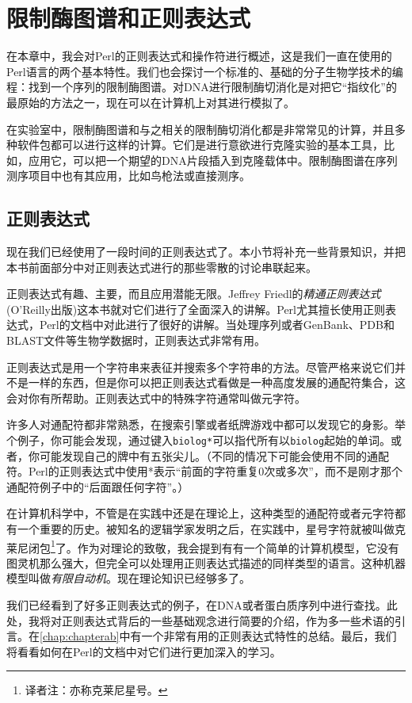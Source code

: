 \chapter{限制酶图谱和正则表达式}
\label{chap:chapter9}
\minitoc

在本章中，我会对Perl的正则表达式和操作符进行概述，这是我们一直在使用的Perl语言的两个基本特性。我们也会探讨一个标准的、基础的分子生物学技术的编程：找到一个序列的限制酶图谱。对DNA进行限制酶切消化是对把它“指纹化”的最原始的方法之一，现在可以在计算机上对其进行模拟了。

在实验室中，限制酶图谱和与之相关的限制酶切消化都是非常常见的计算，并且多种软件包都可以进行这样的计算。它们是进行意欲进行克隆实验的基本工具，比如，应用它，可以把一个期望的DNA片段插入到克隆载体中。限制酶图谱在序列测序项目中也有其应用，比如鸟枪法或直接测序。

\section{正则表达式}
现在我们已经使用了一段时间的正则表达式了。本小节将补充一些背景知识，并把本书前面部分中对正则表达式进行的那些零散的讨论串联起来。

正则表达式有趣、主要，而且应用潜能无限。Jeffrey
Friedl的\textit{精通正则表达式}
(O'Reilly出版)这本书就对它们进行了全面深入的讲解。Perl尤其擅长使用正则表达式，Perl的文档中对此进行了很好的讲解。当处理序列或者GenBank、PDB和BLAST文件等生物学数据时，正则表达式非常有用。

正则表达式是用一个字符串来表征并搜索多个字符串的方法。尽管严格来说它们并不是一样的东西，但是你可以把正则表达式看做是一种高度发展的通配符集合，这会对你有所帮助。正则表达式中的特殊字符通常叫做元字符。

许多人对通配符都非常熟悉，在搜索引擎或者纸牌游戏中都可以发现它的身影。举个例子，你可能会发现，通过键入\verb|biolog*|可以指代所有以\verb|biolog|起始的单词。或者，你可能发现自己的牌中有五张尖儿。（不同的情况下可能会使用不同的通配符。Perl的正则表达式中使用*表示“前面的字符重复0次或多次”，而不是刚才那个通配符例子中的“后面跟任何字符”。）

在计算机科学中，不管是在实践中还是在理论上，这种类型的通配符或者元字符都有一个重要的历史。被知名的逻辑学家发明之后，在实践中，星号字符就被叫做克莱尼闭包\footnote{译者注：亦称克莱尼星号。}了。作为对理论的致敬，我会提到有有一个简单的计算机模型，它没有图灵机那么强大，但完全可以处理用正则表达式描述的同样类型的语言。这种机器模型叫做\textit{有限自动机}。现在理论知识已经够多了。

我们已经看到了好多正则表达式的例子，在DNA或者蛋白质序列中进行查找。此处，我将对正则表达式背后的一些基础观念进行简要的介绍，作为多一些术语的引言。在\autoref{chap:chapterab}中有一个非常有用的正则表达式特性的总结。最后，我们将看看如何在Perl的文档中对它们进行更加深入的学习。

